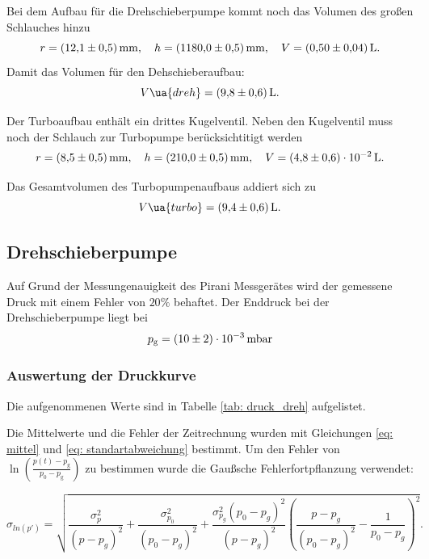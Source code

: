 Bei dem Aufbau für die Drehschieberpumpe kommt noch das Volumen des großen Schlauches  hinzu
\begin{equation*}
  r=\SI{12.1\pm 0.5}{\milli\meter}, \quad h=\SI{1180\pm0.5}{\milli\meter}, \quad V=\SI{ 0.5\pm0.04}{\litre}.
\end{equation*}
Damit das Volumen für den Dehschieberaufbau:
\begin{equation}
  \label{eq:volumen_drehschieber}
  V\ua{dreh}=\SI{9.8\pm0.6}{\litre}.
\end{equation}

Der Turboaufbau enthält ein drittes Kugelventil.
Neben den Kugelventil muss noch der Schlauch zur Turbopumpe  berücksichtitigt werden
\begin{equation*}
  r=\SI{8.5\pm 0.5}{\milli\meter}, \quad h=\SI{210\pm0.5}{\milli\meter}, \quad V=\SI{ 4.8\pm0.6 e-2}{\litre}.
\end{equation*}

Das Gesamtvolumen des Turbopumpenaufbaus addiert sich zu
\begin{equation}
  \label{eq:volume_turbo}
  V\ua{turbo}=\SI{9.4\pm0.6}{\litre}.
\end{equation}
\subsection{Drehschieberpumpe}
Auf Grund der Messungenauigkeit des Pirani Messgerätes wird der gemessene
Druck mit einem Fehler von $20\%$ behaftet.
Der Enddruck bei der Drehschieberpumpe liegt bei
\begin{equation}
  \label{eq:enddruck_drehschieber}
  p_{\mathrm{g}}=\SI{10 \pm 2 e-3}{\milli\bar}
\end{equation}

\subsubsection{Auswertung der Druckkurve}

Die aufgenommenen Werte sind in Tabelle \ref{tab: druck_dreh} aufgelistet.

Die Mittelwerte und die Fehler der Zeitrechnung wurden mit Gleichungen \eqref{eq: mittel} und
\eqref{eq: standartabweichung} bestimmt. Um den Fehler von $\ln(\frac{ p(t)-p_{ \mathrm{g} } }{ p_0-p_{ \mathrm{g} } })$
zu bestimmen wurde die Gaußsche Fehlerfortpflanzung verwendet:

\begin{equation}
  \label{eq: fehler_ln_druck}
  \sigma_{ln(p')}=\sqrt{\frac{\sigma_{p}^{2}}{\left(p - p_{g}\right)^{2}} + \frac{\sigma_{p_{0}}^{2}}{\left(p_{0} - p_{g}\right)^{2}} + \frac{\sigma_{p_{g}}^{2} \left(p_{0} - p_{g}\right)^{2}}{\left(p - p_{g}\right)^{2}} \left(\frac{p - p_{g}}{\left(p_{0} - p_{g}\right)^{2}} - \frac{1}{p_{0} - p_{g}}\right)^{2}}.
\end{equation}

